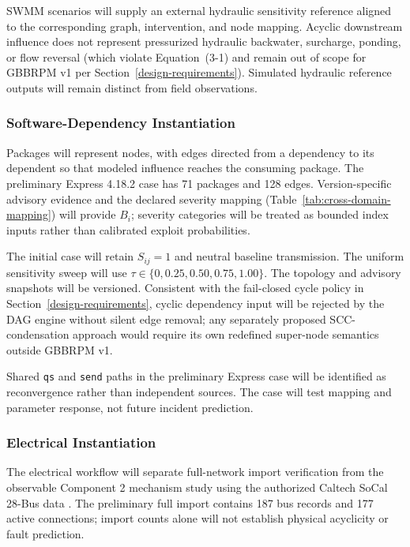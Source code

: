 SWMM scenarios will supply an external hydraulic sensitivity reference aligned
to the corresponding graph, intervention, and node mapping. Acyclic downstream
influence does not represent pressurized hydraulic backwater, surcharge,
ponding, or flow reversal (which violate Equation~(3-1) and remain out of
scope for GBBRPM v1 per Section~\ref{design-requirements}). Simulated
hydraulic reference outputs will remain distinct from field observations.

\subsubsection{Software-Dependency Instantiation}

Packages will represent nodes, with edges directed from a dependency to
its dependent so that modeled influence reaches the consuming package.
The preliminary Express 4.18.2 case has 71 packages and 128 edges.
Version-specific advisory evidence and the declared severity mapping
(Table~\ref{tab:cross-domain-mapping}) will provide $B_i$; severity categories
will be treated as bounded index inputs rather than calibrated exploit
probabilities.

The initial case will retain $S_{ij}=1$ and neutral baseline transmission.
The uniform sensitivity sweep will use
$\tau\in\{0,0.25,0.50,0.75,1.00\}$.
The topology and advisory snapshots will be versioned. Consistent with the
fail-closed cycle policy in Section~\ref{design-requirements}, cyclic
dependency input will be rejected by the DAG engine without silent edge
removal; any separately proposed SCC-condensation approach would require its
own redefined super-node semantics outside GBBRPM v1.

Shared \texttt{qs} and \texttt{send} paths in the preliminary Express
case will be identified as reconvergence rather than independent sources.
The case will test mapping and parameter response, not future incident
prediction.

\subsubsection{Electrical Instantiation}

The electrical workflow will separate full-network import verification
from the observable Component 2 mechanism study using the authorized
Caltech SoCal 28-Bus data \citep{xie2025}. The preliminary full import
contains 187 bus records and 177 active connections; import counts alone
will not establish physical acyclicity or fault prediction.

